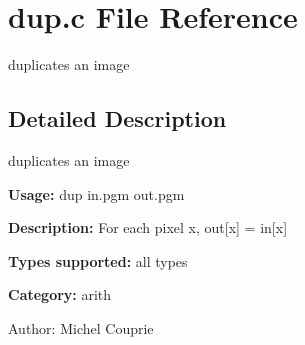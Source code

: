 \section{dup.c File Reference}
\label{dup_8c}
duplicates an image 



\subsection{Detailed Description}
duplicates an image 

{\bf Usage:} dup in.pgm out.pgm

{\bf Description:} For each pixel x, out[x] = in[x]

{\bf Types supported:} all types

{\bf Category:} arith

\begin{Desc}
\item[Author:]Michel Couprie \end{Desc}

